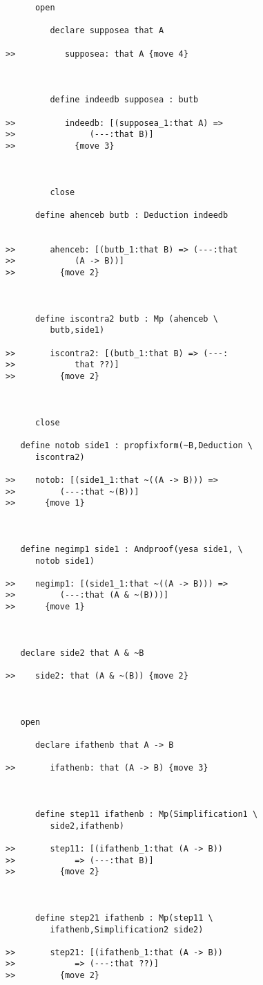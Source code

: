\documentclass[12pt]{article}
\begin{document}
\begin{verbatim}
      open

         declare supposea that A

>>          supposea: that A {move 4}



         define indeedb supposea : butb

>>          indeedb: [(supposea_1:that A) =>
>>               (---:that B)]
>>            {move 3}



         close

      define ahenceb butb : Deduction indeedb


>>       ahenceb: [(butb_1:that B) => (---:that
>>            (A -> B))]
>>         {move 2}



      define iscontra2 butb : Mp (ahenceb \
         butb,side1)

>>       iscontra2: [(butb_1:that B) => (---:
>>            that ??)]
>>         {move 2}



      close

   define notob side1 : propfixform(~B,Deduction \
      iscontra2)

>>    notob: [(side1_1:that ~((A -> B))) =>
>>         (---:that ~(B))]
>>      {move 1}



   define negimp1 side1 : Andproof(yesa side1, \
      notob side1)

>>    negimp1: [(side1_1:that ~((A -> B))) =>
>>         (---:that (A & ~(B)))]
>>      {move 1}



   declare side2 that A & ~B

>>    side2: that (A & ~(B)) {move 2}



   open

      declare ifathenb that A -> B

>>       ifathenb: that (A -> B) {move 3}



      define step11 ifathenb : Mp(Simplification1 \
         side2,ifathenb)

>>       step11: [(ifathenb_1:that (A -> B))
>>            => (---:that B)]
>>         {move 2}



      define step21 ifathenb : Mp(step11 \
         ifathenb,Simplification2 side2)

>>       step21: [(ifathenb_1:that (A -> B))
>>            => (---:that ??)]
>>         {move 2}




\end{verbatim}
\end{document}
